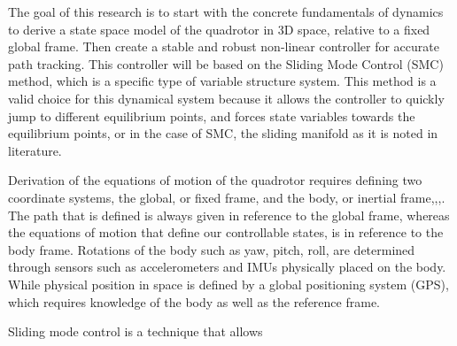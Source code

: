 \documentclass[9pt]{article}
\begin{document}
The goal of this research is to start with the concrete fundamentals of dynamics to derive a state space model of the quadrotor in 3D space, relative to a fixed global frame. Then create a stable and robust non-linear controller for accurate path tracking. This controller will be based on the Sliding Mode Control (SMC) method, which is a specific type of variable structure system. This method is a valid choice for this dynamical system because it allows the controller to quickly jump to different equilibrium points, and forces state variables towards the equilibrium points, or in the case of SMC, the sliding manifold as it is noted in literature.

Derivation of the equations of motion of the quadrotor requires defining two coordinate systems, the global, or fixed frame, and the body, or inertial frame\cite{FanniMohamed2017AN6Q},\cite{FarameeVeeravat2014EotS},\cite{HaomiaoHuang2009Aaco},\cite{DenisKotarski2016CDFU}. The path that is defined is always given in reference to the global frame, whereas the equations of motion that define our controllable states, is in reference to the body frame. Rotations of the body such as yaw, pitch, roll, are determined through sensors such as accelerometers and IMUs physically placed on the body. While physical position in space is defined by a global positioning system (GPS), which requires knowledge of the body as well as the reference frame.

Sliding mode control is a technique that allows



\end{document}

